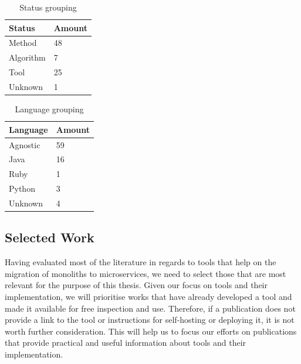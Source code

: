 \documentclass[conference]{IEEEtran}
\begin{document}
\begin{table}[!htb] \caption{Status grouping} \label{tab:status-grouping}
  \begin{center}
    \begin{tabular}[c]{p{12em}|p{4em}}
      \textbf{Status} &
      \textbf{Amount} \\
      \hline Method & {48} \\
      \hline Algorithm & {7} \\
      \hline Tool & {25} \\
      \hline Unknown & {1} \\
    \end{tabular}
  \end{center}
\end{table}

\begin{table}[!htb] \caption{Language grouping} \label{tab:language-grouping}
  \begin{center}
    \begin{tabular}[c]{p{12em}|p{4em}}
      \textbf{Language} &
      \textbf{Amount} \\
      \hline Agnostic & {59} \\
      \hline Java & {16} \\
      \hline Ruby & {1} \\
      \hline Python & {3} \\
      \hline Unknown & {4} \\
    \end{tabular}
  \end{center}
\end{table}

\subsection{Selected Work}

Having evaluated most of the literature in regards to tools that help on the
migration of monoliths to microservices, we need to select those that are most
relevant for the purpose of this thesis. Given our focus on tools and their
implementation, we will prioritise works that have already developed a tool and
made it available for free inspection and use. Therefore, if a publication does
not provide a link to the tool or instructions for self-hosting or deploying
it, it is not worth further consideration. This will help us to focus our
efforts on publications that provide practical and useful information about
tools and their implementation.
\end{document}
